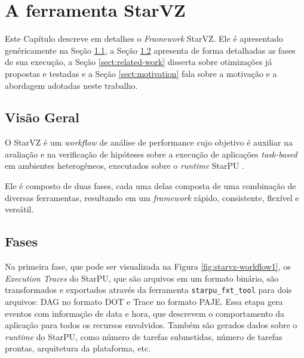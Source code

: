 \chapter{A ferramenta StarVZ} \label{ch:starvz}

Este Capítulo descreve em detalhes o \emph{Framework} StarVZ. Ele é 
apresentado genéricamente na Seção \ref{sect:starvz-overview}, a Seção 
\ref{sect:starvz-phases} apresenta de forma detalhadas as fases de sua 
execução, a Seção \ref{sect:related-work} disserta sobre otimizações já 
propostas e testadas e a Seção \ref{sect:motivation} fala sobre a motivação e a 
abordagem adotadas neste trabalho.

\section{Visão Geral}\label{sect:starvz-overview}
O StarVZ \cite{ref:starvz} é um \emph{workflow} de análise de performance cujo 
objetivo é auxiliar na avaliação e na verificação de hipóteses sobre a execução 
de aplicações \emph{task-based} em ambientes heterogêneos, executados sobre o
\emph{runtime} StarPU \cite{ref:starpu}.



Ele é composto de duas fases, cada uma 
delas composta de uma combinação de diversas ferramentas, resultando em um 
\emph{framework}
rápido, consistente, flexível e versátil.



\section{Fases}\label{sect:starvz-phases}

Na primeira fase, que pode ser visualizada na Figura 
\ref{fig:starvz-workflow1}, 
os 
\emph{Execution Traces} do StarPU, que são arquivos em um formato binário, são 
transformados
e exportados através da ferramenta \texttt{starpu\_fxt\_tool} para dois 
arquivos: DAG no formato DOT 
e Trace no formato PAJE. Essa etapa gera eventos com informação de data e hora, 
que 
descrevem o comportamento da aplicação para todos os recursos envolvidos. 
Também 
são gerados 
dados sobre o \emph{runtime} do StarPU, como número de tarefas submetidas,
número de tarefas prontas, arquitetura da plataforma, etc.

